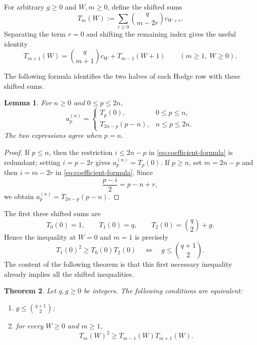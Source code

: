 \documentclass[12pt]{amsart}
\theoremstyle{plain}
\newtheorem{theorem}{Theorem}[section]
\newtheorem{lemma}[theorem]{Lemma}
\theoremstyle{definition}
\theoremstyle{remark}
\begin{document}
For arbitrary \(g\ge0\) and \(W,m\ge0\), define the shifted sums
\begin{equation}\label{eq:T-definition}
 T_m(W):=\sum_{r\ge0}\binom q{m-2r}c_{W+r}.
\end{equation}
Separating the term \(r=0\) and shifting the remaining index gives the
useful identity
\begin{equation}\label{eq:T-shift}
 T_{m+1}(W)
 =\binom q{m+1}c_W+T_{m-1}(W+1)
 \qquad(m\ge1,\ W\ge0).
\end{equation}

The following formula identifies the two halves of each Hodge row with
these shifted sums.

\begin{lemma}\label{lem:two-coefficient-forms}
For \(n\ge0\) and \(0\le p\le2n\),
\begin{equation}\label{eq:hodge-to-T}
 a_p^{(n)}=
 \begin{cases}
  T_p(0),&0\le p\le n,\\
  T_{2n-p}(p-n),&n\le p\le2n.
 \end{cases}
\end{equation}
The two expressions agree when \(p=n\).
\end{lemma}

\begin{proof}
If \(p\le n\), then the restriction \(i\le2n-p\) in
\eqref{eq:coefficient-formula} is redundant; setting \(i=p-2r\) gives
\(a_p^{(n)}=T_p(0)\).  If \(p\ge n\), set \(m=2n-p\) and then
\(i=m-2r\) in \eqref{eq:coefficient-formula}.  Since
\[
 \frac{p-i}{2}=p-n+r,
\]
we obtain \(a_p^{(n)}=T_{2n-p}(p-n)\).
\end{proof}

The first three shifted sums are
\[
 T_0(0)=1,
 \qquad
 T_1(0)=q,
 \qquad
 T_2(0)=\binom q2+g.
\]
Hence the inequality at \(W=0\) and \(m=1\) is precisely
\[
 T_1(0)^2\ge T_0(0)T_2(0)
 \quad\Longleftrightarrow\quad
 g\le\binom{q+1}{2}.
\]
The content of the following theorem is that this first necessary
inequality already implies all the shifted inequalities.

\begin{theorem}\label{thm:universal-tail}
Let \(q,g\ge0\) be integers.  The following conditions are equivalent:
\begin{enumerate}[label=\textup{(\roman*)}]
\item \(g\le\binom{q+1}{2}\);
\item for every \(W\ge0\) and \(m\ge1\),
      \begin{equation}\label{eq:universal-tail}
       T_m(W)^2\ge T_{m-1}(W)T_{m+1}(W).
      \end{equation}
\end{enumerate}
\end{theorem}
\end{document}
